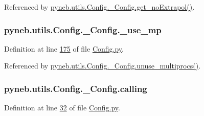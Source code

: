 Referenced by \hyperlink{_config_8py_source_l00112}{pyneb.\-utils.\-Config.\-\_\-\-Config.\-get\-\_\-no\-Extrapol()}.

\hypertarget{classpyneb_1_1utils_1_1_config_1_1___config_a29aefac8a5bc01cb564c9fc12755fe7c}{
\subsubsection[{\-\_\-use\-\_\-mp}]{\setlength{\rightskip}{0pt plus 5cm}pyneb.\-utils.\-Config.\-\_\-\-Config.\-\_\-use\-\_\-mp\hspace{0.3cm}{\ttfamily [private]}}}\label{classpyneb_1_1utils_1_1_config_1_1___config_a29aefac8a5bc01cb564c9fc12755fe7c}


Definition at line \hyperlink{_config_8py_source_l00175}{175} of file \hyperlink{_config_8py_source}{Config.\-py}.



Referenced by \hyperlink{_config_8py_source_l00177}{pyneb.\-utils.\-Config.\-\_\-\-Config.\-unuse\-\_\-multiprocs()}.

\hypertarget{classpyneb_1_1utils_1_1_config_1_1___config_abf04542e5670abea107260ca7a6baf6d}{
\subsubsection[{calling}]{\setlength{\rightskip}{0pt plus 5cm}pyneb.\-utils.\-Config.\-\_\-\-Config.\-calling}}\label{classpyneb_1_1utils_1_1_config_1_1___config_abf04542e5670abea107260ca7a6baf6d}


Definition at line \hyperlink{_config_8py_source_l00032}{32} of file \hyperlink{_config_8py_source}{Config.\-py}.



